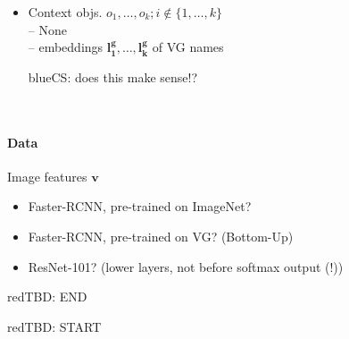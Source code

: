 \documentclass[11pt,a4paper]{article}
\renewcommand{\vec}[1]{\mathbf{#1}\xspace}
\newcommand{\cs}[1]{\begin{color}{blue}CS: #1\end{color}\xspace}
\newcommand{\tbd}[1]{\begin{color}{red}TBD: #1\end{color}\xspace}
\begin{document}
\begin{description}
\begin{itemize}
		(A) for ranking loss objective:\\
		-- embedding(s) $\vec{l_i}$ of candidate name(s)\\
		-- length of name, in letters\\
		(B) for KL divergence objective:\\
		-- None \\
		-- embedding $\vec{l^g_i}$ of VG name \cs{does this make sense!?}
		\item Context objs. \mbox{$o_1, \dots, o_k; i \notin \{1, \dots, k\}$}\\
		-- None \\
		-- embeddings $\vec{l^g_1}, \dots, \vec{l^g_k}$ of VG names \cs{does this make sense!?}\\
	\end{itemize}
\end{description}

\paragraph{Data}
Image features $\mathbf{v}$
\begin{itemize}
	\item Faster-RCNN, pre-trained on ImageNet?
	\item Faster-RCNN, pre-trained on VG? (Bottom-Up)
	\item ResNet-101? (lower layers, not before softmax output (!))
\end{itemize}
\tbd{END}

\noindent
\tbd{START}
\end{document}
